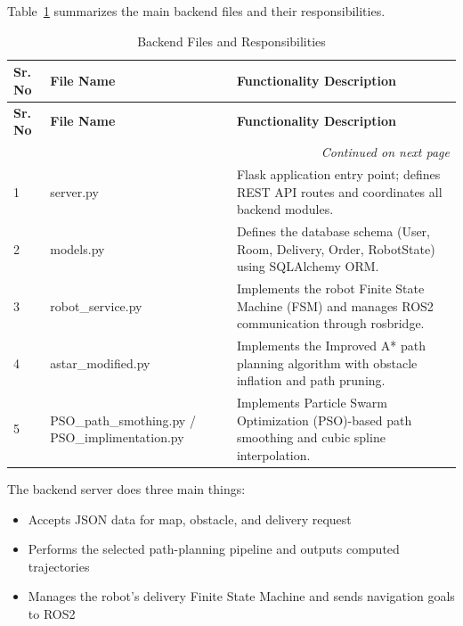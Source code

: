 Table~\ref{tab:backend_files} summarizes the main backend files and their responsibilities.
\begin{longtable}{|p{0.8cm}|p{4.5cm}|p{8cm}|}
	\caption{Backend Files and Responsibilities}
	\label{tab:backend_files}\\
	
	\hline
	\textbf{Sr. No} & \textbf{File Name} & \textbf{Functionality Description} \\
	\hline
	\endfirsthead
	
	\hline
	\textbf{Sr. No} & \textbf{File Name} & \textbf{Functionality Description} \\
	\hline
	\endhead
	
	\hline
	\multicolumn{3}{|r|}{\textit{Continued on next page}} \\
	\hline
	\endfoot
	
	\hline
	\endlastfoot
	
	1 & server.py & Flask application entry point; defines REST API routes and coordinates all backend modules. \\
	\hline
	
	2 & models.py & Defines the database schema (User, Room, Delivery, Order, RobotState) using SQLAlchemy ORM. \\
	\hline
	
	3 & robot\_service.py & Implements the robot Finite State Machine (FSM) and manages ROS2 communication through rosbridge. \\
	\hline
	
	4 & astar\_modified.py & Implements the Improved A* path planning algorithm with obstacle inflation and path pruning. \\
	\hline
	
	5 & PSO\_path\_smothing.py / PSO\_implimentation.py & Implements Particle Swarm Optimization (PSO)-based path smoothing and cubic spline interpolation. \\
	\hline
	
\end{longtable}
The backend server does three main things:
\begin{itemize}[noitemsep]
	\item Accepts JSON data for map, obstacle, and delivery request
	\item Performs the selected path-planning pipeline and outputs computed trajectories
	\item Manages the robot's delivery Finite State Machine and sends navigation goals to ROS2
\end{itemize}

